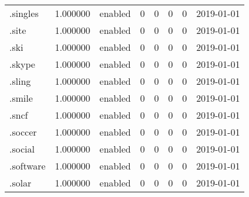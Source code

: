 \begin{tabular}{lrlrrrrl}
.singles                  &          1.000000 &         enabled &                           0 &                           0 &                           0 &                   0 &           2019-01-01 \\
.site                     &          1.000000 &         enabled &                           0 &                           0 &                           0 &                   0 &           2019-01-01 \\
.ski                      &          1.000000 &         enabled &                           0 &                           0 &                           0 &                   0 &           2019-01-01 \\
.skype                    &          1.000000 &         enabled &                           0 &                           0 &                           0 &                   0 &           2019-01-01 \\
.sling                    &          1.000000 &         enabled &                           0 &                           0 &                           0 &                   0 &           2019-01-01 \\
.smile                    &          1.000000 &         enabled &                           0 &                           0 &                           0 &                   0 &           2019-01-01 \\
.sncf                     &          1.000000 &         enabled &                           0 &                           0 &                           0 &                   0 &           2019-01-01 \\
.soccer                   &          1.000000 &         enabled &                           0 &                           0 &                           0 &                   0 &           2019-01-01 \\
.social                   &          1.000000 &         enabled &                           0 &                           0 &                           0 &                   0 &           2019-01-01 \\
.software                 &          1.000000 &         enabled &                           0 &                           0 &                           0 &                   0 &           2019-01-01 \\
.solar                    &          1.000000 &         enabled &                           0 &                           0 &                           0 &                   0 &           2019-01-01 \\

\end{tabular}
